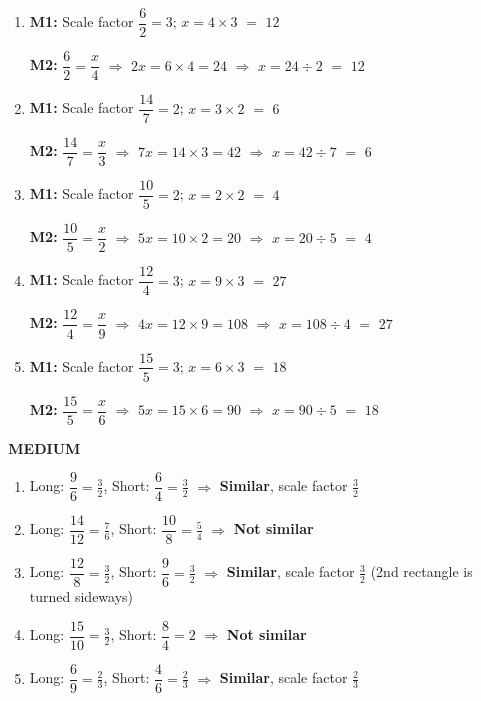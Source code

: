 \documentclass[11pt]{article}
\newcommand{\ans}[1]{\textcolor{fmans}{\textbf{#1}}}
\newcommand{\leveltag}[2]{\colorbox{#1}{\color{white}\bfseries\small\,#2\,}}
\begin{document}
\begin{enumerate}[label=\textbf{\arabic*.},start=6,itemsep=2mm,leftmargin=*]
\item \textbf{M1:} Scale factor $\dfrac{6}{2} = 3$; \; $x = 4 \times 3$ $=$ \ans{$12$}\par\textbf{M2:} $\dfrac{6}{2} = \dfrac{x}{4}$ \;$\Rightarrow$\; $2x = 6 \times 4 = 24$ \;$\Rightarrow$\; $x = 24 \div 2$ $=$ \ans{$12$}
\item \textbf{M1:} Scale factor $\dfrac{14}{7} = 2$; \; $x = 3 \times 2$ $=$ \ans{$6$}\par\textbf{M2:} $\dfrac{14}{7} = \dfrac{x}{3}$ \;$\Rightarrow$\; $7x = 14 \times 3 = 42$ \;$\Rightarrow$\; $x = 42 \div 7$ $=$ \ans{$6$}
\item \textbf{M1:} Scale factor $\dfrac{10}{5} = 2$; \; $x = 2 \times 2$ $=$ \ans{$4$}\par\textbf{M2:} $\dfrac{10}{5} = \dfrac{x}{2}$ \;$\Rightarrow$\; $5x = 10 \times 2 = 20$ \;$\Rightarrow$\; $x = 20 \div 5$ $=$ \ans{$4$}
\item \textbf{M1:} Scale factor $\dfrac{12}{4} = 3$; \; $x = 9 \times 3$ $=$ \ans{$27$}\par\textbf{M2:} $\dfrac{12}{4} = \dfrac{x}{9}$ \;$\Rightarrow$\; $4x = 12 \times 9 = 108$ \;$\Rightarrow$\; $x = 108 \div 4$ $=$ \ans{$27$}
\item \textbf{M1:} Scale factor $\dfrac{15}{5} = 3$; \; $x = 6 \times 3$ $=$ \ans{$18$}\par\textbf{M2:} $\dfrac{15}{5} = \dfrac{x}{6}$ \;$\Rightarrow$\; $5x = 15 \times 6 = 90$ \;$\Rightarrow$\; $x = 90 \div 5$ $=$ \ans{$18$}
\end{enumerate}
\needspace{4cm}\leveltag{fmturn}{MEDIUM}\par\vspace{1mm}
\begin{enumerate}[label=\textbf{\arabic*.},start=1,itemsep=2mm,leftmargin=*]
\item Long: $\dfrac{9}{6} = \tfrac{3}{2}$, \; Short: $\dfrac{6}{4} = \tfrac{3}{2}$ \;$\Rightarrow$\; \ans{Similar}, scale factor \ans{$\tfrac{3}{2}$}
\item Long: $\dfrac{14}{12} = \tfrac{7}{6}$, \; Short: $\dfrac{10}{8} = \tfrac{5}{4}$ \;$\Rightarrow$\; \ans{Not similar}
\item Long: $\dfrac{12}{8} = \tfrac{3}{2}$, \; Short: $\dfrac{9}{6} = \tfrac{3}{2}$ \;$\Rightarrow$\; \ans{Similar}, scale factor \ans{$\tfrac{3}{2}$} {\small\color{fmgray}(2nd rectangle is turned sideways)}
\item Long: $\dfrac{15}{10} = \tfrac{3}{2}$, \; Short: $\dfrac{8}{4} = 2$ \;$\Rightarrow$\; \ans{Not similar}
\item Long: $\dfrac{6}{9} = \tfrac{2}{3}$, \; Short: $\dfrac{4}{6} = \tfrac{2}{3}$ \;$\Rightarrow$\; \ans{Similar}, scale factor \ans{$\tfrac{2}{3}$}
\end{enumerate}
\end{document}
